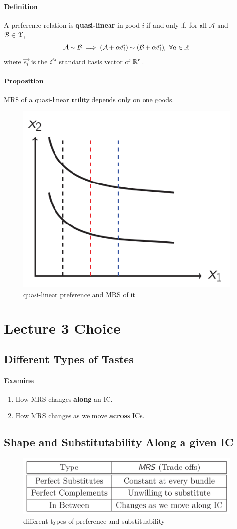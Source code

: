 \documentclass{article}
\newcommand{\mc}[1]{\mathcal{#1}}
\begin{document}
			\paragraph{Definition} A preference relation is \textbf{quasi-linear} in good $i$ if and only if, for all $\mc{A}$ and $\mc{B} \in \mc{X}$, 
			\[
				\mc{A} \sim \mc{B} \implies (\mc{A} + \alpha \vec{e_i}) \sim (\mc{B} + \alpha \vec{e_i}),\ \forall a \in \R
			\] where $\vec{e_i}$ is the $i^{th}$ standard basis vector of $\mathbb{R}^n$.
			
			\paragraph{Proposition} MRS of a quasi-linear utility depends only on one goods.
			
			\begin{figure}[h]
				\centering
				\includegraphics[width=0.35\linewidth]{figure/lec2_3}
				\caption{quasi-linear preference and MRS of it}
			\end{figure}
			 
	\section{Lecture 3 Choice}
		\subsection{Different Types of Tastes}
			\paragraph{Examine} 
				\begin{enumerate}
					\item How MRS changes \textbf{along} an IC.
					\item How MRS changes as we move \textbf{across} ICs.
				\end{enumerate}
		
		\subsection{Shape and Substitutability Along a given IC}
			\begin{figure}[h]
				\centering
				\includegraphics[width=0.7\linewidth]{figure/lec3_1}
				\caption{different types of preference and substituability}
			\end{figure}
		
\end{document}
